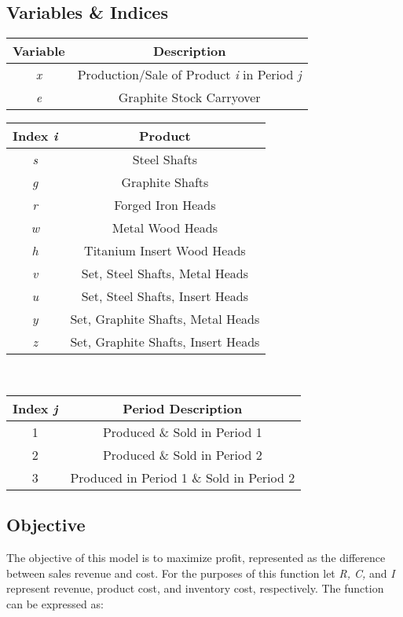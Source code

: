 \documentclass{article}
\begin{document}
\subsection{Variables \& Indices}

\begin{tabular}{ |c | c| }
\hline
\textbf{Variable} & \textbf{Description} \\
\hline
\textit{x} & Production/Sale of Product \textit{i} in Period \textit{j} \\
\textit{e} & Graphite Stock Carryover \\
\hline
\end{tabular}
\vspace{5mm}

\noindent
\begin{tabular}{| c | c |}
\hline
\textbf{Index \textit{i}} & \textbf{Product} \\
\hline
\textit{s} & Steel Shafts \\
\textit{g} & Graphite Shafts \\
\textit{r} & Forged Iron Heads \\
\textit{w} & Metal Wood Heads \\
\textit{h} & Titanium Insert Wood Heads \\
\textit{v} & Set, Steel Shafts, Metal Heads \\
\textit{u} & Set, Steel Shafts, Insert Heads \\
\textit{y} & Set, Graphite Shafts, Metal Heads \\
\textit{z} & Set, Graphite Shafts, Insert Heads \\
\hline
\end{tabular}
\vspace{5mm}
\\
\begin{tabular}{ | c | c | }
\hline
\textbf{Index \textit{j}} & \textbf{Period Description} \\
\hline
1 & Produced \& Sold in Period 1 \\
2 & Produced \& Sold in Period 2 \\
3 & Produced in Period 1 \& Sold in Period 2 \\
\hline
\end{tabular}

\subsection{Objective}
The objective of this model is to maximize profit, represented as the difference between sales revenue and cost.  For the purposes of this function let \textit{R, C,} and \textit{I} represent revenue, product cost, and inventory cost, respectively.  The function can be expressed as:
\end{document}
